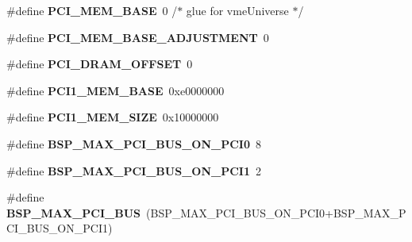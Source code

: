 \begin{DoxyCompactItemize}
\item 
\mbox{\label{group__RTEMSBSPsPowerPCMVME5500_ga4780c0ef836bde00880830140efb1024}} 
\#define {\bfseries P\+C\+I\+\_\+\+M\+E\+M\+\_\+\+B\+A\+SE}~0  /$\ast$ glue for vme\+Universe $\ast$/
\item 
\mbox{\label{group__RTEMSBSPsPowerPCMVME5500_ga9d05e784132095bfc681cf7ab6c1f303}} 
\#define {\bfseries P\+C\+I\+\_\+\+M\+E\+M\+\_\+\+B\+A\+S\+E\+\_\+\+A\+D\+J\+U\+S\+T\+M\+E\+NT}~0
\item 
\mbox{\label{group__RTEMSBSPsPowerPCMVME5500_ga6d9f8ace1e46327132d0a991c6785b40}} 
\#define {\bfseries P\+C\+I\+\_\+\+D\+R\+A\+M\+\_\+\+O\+F\+F\+S\+ET}~0
\item 
\mbox{\label{group__RTEMSBSPsPowerPCMVME5500_ga911e017ff100d8cbf9c2f8c59c3be314}} 
\#define {\bfseries P\+C\+I1\+\_\+\+M\+E\+M\+\_\+\+B\+A\+SE}~0xe0000000
\item 
\mbox{\label{group__RTEMSBSPsPowerPCMVME5500_ga2215b303283fd47d7edf947665bce1c1}} 
\#define {\bfseries P\+C\+I1\+\_\+\+M\+E\+M\+\_\+\+S\+I\+ZE}~0x10000000
\item 
\mbox{\label{group__RTEMSBSPsPowerPCMVME5500_gaffd2901b19b15ac8ebb5642bb0d587e4}} 
\#define {\bfseries B\+S\+P\+\_\+\+M\+A\+X\+\_\+\+P\+C\+I\+\_\+\+B\+U\+S\+\_\+\+O\+N\+\_\+\+P\+C\+I0}~8
\item 
\mbox{\label{group__RTEMSBSPsPowerPCMVME5500_gac6de95dd07dd6ae2a521ba6587f11caf}} 
\#define {\bfseries B\+S\+P\+\_\+\+M\+A\+X\+\_\+\+P\+C\+I\+\_\+\+B\+U\+S\+\_\+\+O\+N\+\_\+\+P\+C\+I1}~2
\item 
\mbox{\label{group__RTEMSBSPsPowerPCMVME5500_ga538fce2d1f0cdfbee5de24b9ed38e618}} 
\#define {\bfseries B\+S\+P\+\_\+\+M\+A\+X\+\_\+\+P\+C\+I\+\_\+\+B\+US}~(B\+S\+P\+\_\+\+M\+A\+X\+\_\+\+P\+C\+I\+\_\+\+B\+U\+S\+\_\+\+O\+N\+\_\+\+P\+C\+I0+B\+S\+P\+\_\+\+M\+A\+X\+\_\+\+P\+C\+I\+\_\+\+B\+U\+S\+\_\+\+O\+N\+\_\+\+P\+C\+I1)
\item 
\mbox{\label{group__RTEMSBSPsPowerPCMVME5500_gad8266cc4bcc376e849b07d8e2d05b5a1}} 

\end{DoxyCompactItemize}
